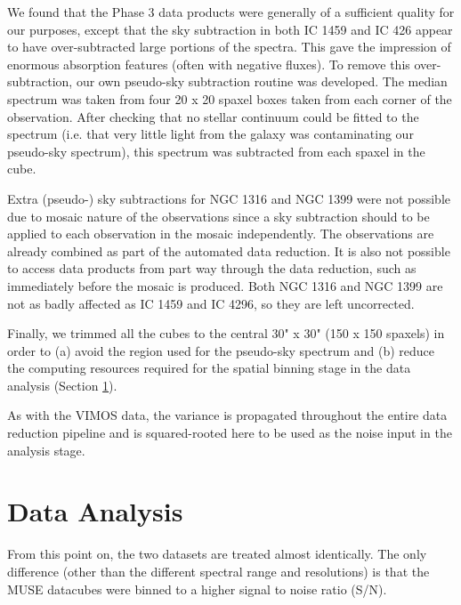 		We found that the Phase 3 data products were generally of a sufficient quality for our purposes, except that the sky subtraction in both IC 1459 and IC 426 appear to have over-subtracted large portions of the spectra. This gave the impression of enormous absorption features (often with negative fluxes). To remove this over-subtraction, our own pseudo-sky subtraction routine was developed. The median spectrum was taken from four 20 x 20 spaxel boxes taken from each corner of the observation. After checking that no stellar continuum could be fitted to the spectrum (i.e. that very little light from the galaxy was contaminating our pseudo-sky spectrum), this spectrum was subtracted from each spaxel in the cube. 

		Extra (pseudo-) sky subtractions for NGC 1316 and NGC 1399 were not possible due to mosaic nature of the observations since a sky subtraction should to be applied to each observation in the mosaic independently. The observations are already combined as part of the automated data reduction. It is also not possible to access data products from part way through the data reduction, such as immediately before the mosaic is produced. Both NGC 1316 and NGC 1399 are not as badly affected as IC 1459 and IC 4296, so they are left uncorrected. 

		Finally, we trimmed all the cubes to the central 30" x 30" (150 x 150 spaxels) in order to (a) avoid the region used for the pseudo-sky spectrum and (b) reduce the computing resources required for the spatial binning stage in the data analysis (Section \ref{sec:analysis}). 

		As with the VIMOS data, the variance is propagated throughout the entire data reduction pipeline and is squared-rooted here to be used as the noise input in the analysis stage. 
\section{Data Analysis}
	\label{sec:analysis}
	From this point on, the two datasets are treated almost identically. The only difference (other than the different spectral range and resolutions) is that the MUSE datacubes were binned to a higher signal to noise ratio (S/N).

